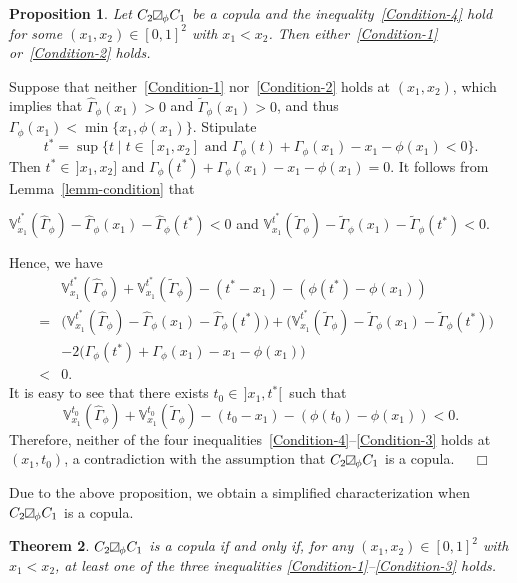 \documentclass[12pt]{article}
\renewenvironment{proof}{\noindent{\bf Proof.}}{~~$\Box$}
\theoremstyle{plain}
\newtheorem{thrm}{Theorem}[section]
\newtheorem{prot}[thrm]{Proposition}
\theoremstyle{definition}
\newcommand{\MySs}{
\begin{tikzpicture}[baseline]
\draw (0,0em) -- (0em,0.6em) -- (0.6em,0.6em) -- (0.6em,0em) -- (0,0em);
\draw (0,0em) parabola (0.6em, 0.6em);
\end{tikzpicture}}
\begin{document}
\begin{prot}
Let $C_2\MySs_\phi C_1$ be a copula and the inequality~\eqref{Condition-4} hold for some $(x_1, x_2)\in[0, 1]^2$ with $x_1<x_2$.
Then either~\eqref{Condition-1} or~\eqref{Condition-2} holds.
\end{prot}
\begin{proof}
Suppose that neither~\eqref{Condition-1} nor~\eqref{Condition-2} holds at $(x_1, x_2)$, which implies that $\hat{\Gamma}_\phi(x_1)>0$ and $\tilde{\Gamma}_\phi(x_1)>0$, and thus $\Gamma_\phi(x_1)<\min\{x_1, \phi(x_1)\}$. Stipulate
\[
t^*=\sup\{t\mid t\in [x_1, x_2]\mbox{~and~}\Gamma_\phi(t)+\Gamma_\phi(x_1)-x_1-\phi(x_1)<0\}.
\]
Then $t^*\in\,]x_1, x_2]$ and $\Gamma_\phi(t^*)+\Gamma_\phi(x_1)-x_1-\phi(x_1)=0$. It follows from Lemma~\ref{lemm-condition} that

\centerline{$\mathbb{V}_{x_1}^{t^*}(\hat{\Gamma}_\phi)-\hat{\Gamma}_\phi(x_1)-\hat{\Gamma}_\phi(t^*)< 0$ and $\mathbb{V}_{x_1}^{t^*}(\tilde{\Gamma}_\phi)-\tilde{\Gamma}_\phi(x_1)-\tilde{\Gamma}_\phi(t^*)< 0$.}

\noindent Hence, we have
\begin{eqnarray*}
&&\mathbb{V}_{x_1}^{t^*}(\hat{\Gamma}_\phi)+\mathbb{V}_{x_1}^{t^*}(\tilde{\Gamma}_\phi)-(t^*-x_1)-(\phi(t^*)-\phi(x_1))\\
&=&\Big(\mathbb{V}_{x_1}^{t^*}(\hat{\Gamma}_\phi)-\hat{\Gamma}_\phi(x_1)-\hat{\Gamma}_\phi(t^*)\Big)
+\Big(\mathbb{V}_{x_1}^{t^*}(\tilde{\Gamma}_\phi)-\tilde{\Gamma}_\phi(x_1)-\tilde{\Gamma}_\phi(t^*)\Big)\\
&& -2\Big(\Gamma_\phi(t^*)+\Gamma_\phi(x_1)-x_1-\phi(x_1)\Big)\\
&<& 0.
\end{eqnarray*}
It is easy to see that there exists $t_0\in\,]x_1, t^*[\,$ such that
\[\mathbb{V}_{x_1}^{t_0}(\hat{\Gamma}_\phi)+\mathbb{V}_{x_1}^{t_0}(\tilde{\Gamma}_\phi)-(t_0-x_1)-(\phi(t_0)-\phi(x_1))<0.\]
Therefore, neither of the four inequalities~\eqref{Condition-4}--\eqref{Condition-3} holds at $(x_1, t_0)$, a contradiction with
the assumption that $C_2\MySs_\phi C_1$ is a copula.
\end{proof}

Due to the above proposition, we obtain a simplified characterization when $C_2\MySs_\phi C_1$ is a copula.
\begin{thrm}\label{thrm-CbeCopu}
$C_2\MySs_\phi C_1$ is a copula if and only if, for any $(x_1, x_2)\in[0, 1]^2$ with $x_1<x_2$, at least one of the three inequalities \eqref{Condition-1}--\eqref{Condition-3} holds.
\end{thrm}
\end{document}

